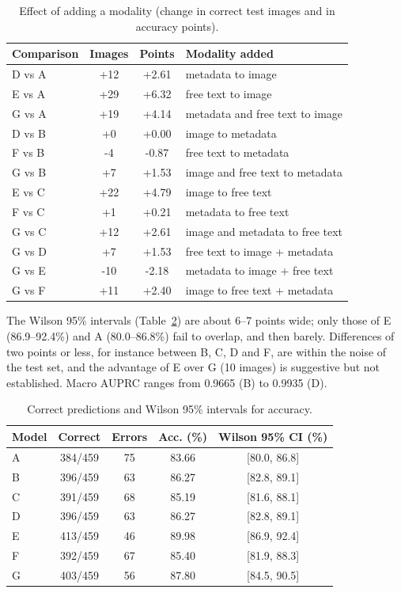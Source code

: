 \documentclass[conference]{IEEEtran}
\begin{document}
\begin{table}[!t]
\caption{Effect of adding a modality (change in correct test images and in accuracy points).}
\label{tab:add}
\centering\scriptsize\setlength{\tabcolsep}{3pt}
\begin{tabular}{lccl}
\toprule
Comparison & Images & Points & Modality added \\
\midrule
D vs A & +12 & +2.61 & metadata to image \\
E vs A & +29 & +6.32 & free text to image \\
G vs A & +19 & +4.14 & metadata and free text to image \\
D vs B & +0 & +0.00 & image to metadata \\
F vs B & -4 & -0.87 & free text to metadata \\
G vs B & +7 & +1.53 & image and free text to metadata \\
E vs C & +22 & +4.79 & image to free text \\
F vs C & +1 & +0.21 & metadata to free text \\
G vs C & +12 & +2.61 & image and metadata to free text \\
G vs D & +7 & +1.53 & free text to image + metadata \\
G vs E & -10 & -2.18 & metadata to image + free text \\
G vs F & +11 & +2.40 & image to free text + metadata \\
\bottomrule
\end{tabular}
\end{table}


The Wilson 95\% intervals (Table~\ref{tab:ci}) are about 6--7 points wide; only those of E (86.9--92.4\%) and A (80.0--86.8\%) fail to overlap, and then barely. Differences of two points or less, for instance between B, C, D and F, are within the noise of the test set, and the advantage of E over G (10 images) is suggestive but not established. Macro AUPRC ranges from 0.9665 (B) to 0.9935 (D).

\begin{table}[!t]
\caption{Correct predictions and Wilson 95\% intervals for accuracy.}
\label{tab:ci}
\centering\scriptsize\setlength{\tabcolsep}{3pt}
\begin{tabular}{lcccc}
\toprule
Model & Correct & Errors & Acc. (\%) & Wilson 95\% CI (\%) \\
\midrule
A & 384/459 & 75 & 83.66 & [80.0, 86.8] \\
B & 396/459 & 63 & 86.27 & [82.8, 89.1] \\
C & 391/459 & 68 & 85.19 & [81.6, 88.1] \\
D & 396/459 & 63 & 86.27 & [82.8, 89.1] \\
E & 413/459 & 46 & 89.98 & [86.9, 92.4] \\
F & 392/459 & 67 & 85.40 & [81.9, 88.3] \\
G & 403/459 & 56 & 87.80 & [84.5, 90.5] \\
\bottomrule
\end{tabular}
\end{table}
\end{document}
